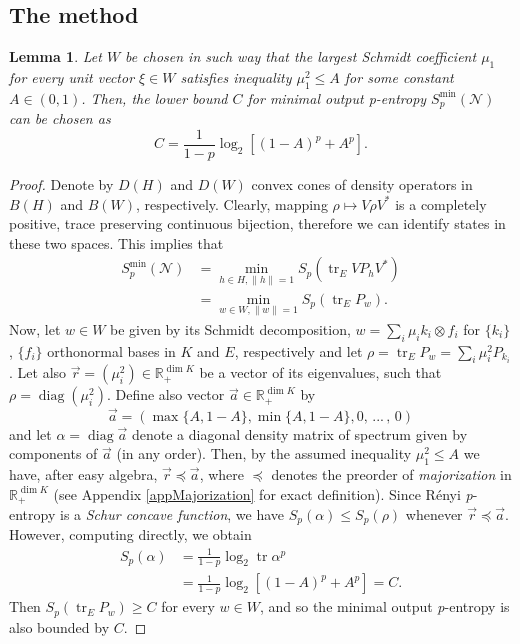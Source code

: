 \documentclass[reqno]{amsart}
\theoremstyle{plain}
\newtheorem{lemma}[theorem]{Lemma}
\theoremstyle{note}
\newcommand{\reals}{\mathbb{R}}
\newcommand\tr{\operatorname{tr}}
\newcommand{\ptr}[2]{\operatorname{tr}_{#1}{#2}}
\newcommand{\proj}[1]{P_{#1}}
\newcommand\diag{\operatorname{diag}}
\begin{document}
\subsection{The method}

\begin{lemma}\label{lemma:LowerBoundValue}
Let $W$ be chosen in such way that the largest Schmidt coefficient $\mu_1$ for every unit vector $\xi \in W$ satisfies inequality $\mu_{1}^{2} \leqslant A$ for some constant $A \in (0,1)$. Then, the lower bound $C$ for minimal output \textit{p}-entropy $S_{p}^{\mathrm{min}} (\mathcal{N})$ can be chosen as
\begin{equation}
    C = \frac{1}{1-p}\log_2 {\left[ (1-A)^p + A^p \right]}.
\end{equation}
\end{lemma}

\begin{proof}
Denote by $D(H)$ and $D(W)$ convex cones of density operators in $B(H)$ and $B(W)$, respectively. Clearly, mapping $\rho \mapsto V \rho V^*$ is a completely positive, trace preserving continuous bijection, therefore we can identify states in these two spaces. This implies that
\begin{align}
    S_{p}^{\mathrm{min}}(\mathcal{N}) &= \min_{h \in H, \| h \|=1}{S_p (\ptr{E}{V\proj{h}V^*})} \\
    &= \min_{w \in W, \| w \| = 1}{S_p (\ptr{E}{\proj{w}})}.\nonumber
\end{align}
Now, let $w\in W$ be given by its Schmidt decomposition, $w = \sum_i \mu_i k_i \otimes f_i$ for $\{k_i\}$, $\{f_i\}$ orthonormal bases in $K$ and $E$, respectively and let $\rho = \ptr{E}{\proj{w}} = \sum_i \mu_{i}^{2} \proj{k_i}$. Let also $\vec{r} = (\mu_{i}^{2}) \in \reals_{+}^{\dim{K}}$ be a vector of its eigenvalues, such that $\rho = \diag{(\mu_{i}^{2})}$. Define also vector $\vec{a}\in\reals_{+}^{\dim{K}}$ by
\begin{equation}
    \vec{a} = (\max{\{A,1-A\}}, \min{\{A,1-A\}}, 0, \, ... \, , \, 0)
\end{equation}
and let $\alpha = \diag{\vec{a}}$ denote a diagonal density matrix of spectrum given by components of $\vec{a}$ (in any order). Then, by the assumed inequality $\mu_{1}^{2} \leqslant A$ we have, after easy algebra, $\vec{r} \preceq \vec{a}$, where $\preceq$ denotes the preorder of \emph{majorization} in $\reals_{+}^{\dim{K}}$ (see Appendix \ref{appMajorization} for exact definition). Since R\'{e}nyi \textit{p}-entropy is a \emph{Schur concave function}, we have $S_{p}(\alpha) \leqslant S_{p}(\rho)$ whenever $\vec{r}\preceq \vec{a}$. However, computing directly, we obtain
\begin{align}
    S_{p}(\alpha) &= \frac{1}{1-p} \log_{2}{\tr{\alpha^p}} \\
    &= \frac{1}{1-p}\log_{2}\left[ (1-A)^p + A^p \right] = C.\nonumber
\end{align}
Then $S_{p}(\ptr{E}{\proj{w}}) \geqslant C$ for every $w\in W$, and so the minimal output \textit{p}-entropy is also bounded by $C$.
\end{proof}
\end{document}
